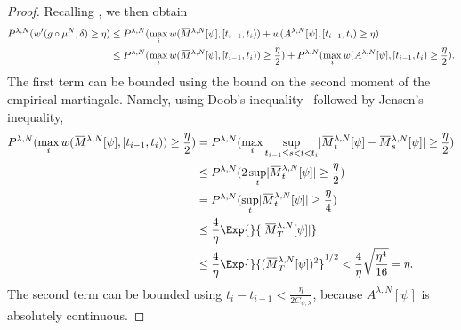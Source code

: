 \begin{proof}
  Recalling , we then obtain
  \begin{equation}
    \begin{split}
      P^{\lambda, N} (w'(g \circ \mu^N, \delta) \geq \eta)
       & \leq P^{\lambda, N}( \max_i w(\ol{M}^{\lambda, N}[\psi], [t_{i-1}, t_i)) + w(A^{\lambda, N}[\psi], [t_{i-1}, t_i) \geq \eta)                                                        \\
       & \leq P^{\lambda, N}( \max_i w(\ol{M}^{\lambda, N}[\psi], [t_{i-1}, t_i)) \geq \frac{\eta}{2}) + P^{\lambda, N}( \max_i w(A^{\lambda, N}[\psi], [t_{i-1}, t_i) \geq \frac{\eta}{2}).
    \end{split}
  \end{equation}
  The first term can be bounded using the bound on the second moment of the empirical martingale.
  Namely, using Doob's inequality~\cite[64]{ethierMarkovProcessesCharacterization1986} followed by Jensen's inequality,
  \begin{equation}
    \begin{split}
      P^{\lambda, N}( \max_i w(\ol{M}^{\lambda, N}[\psi], [t_{i-1}, t_i)) \geq \frac{\eta}{2} )
       & = P^{\lambda, N}( \max_i \sup_{t_{i-1} \leq s < t < t_i} \abs{ \ol{M}_t^{\lambda, N}[\psi] - \ol{M}_s^{\lambda, N}[\psi] } \geq \frac{\eta}{2} ) \\
       & \leq P^{\lambda, N}( 2 \sup_{t} \abs{ \ol{M}_t^{\lambda, N}[\psi] } \geq \frac{\eta}{2} )                                                        \\
       & = P^{\lambda, N}( \sup_{t} \abs{ \ol{M}_t^{\lambda, N}[\psi] } \geq \frac{\eta}{4} )                                                             \\
       & \leq \frac{4}{\eta} \Exp{}{\abs{ \ol{M}_T^{\lambda, N}[\psi] }}                                                                                  \\
       & \leq \frac{4}{\eta} \Exp{}{ ( \ol{M}_T^{\lambda, N}[\psi] )^2 }^{1/2}
      < \frac{4}{\eta} \sqrt{\frac{\eta^4}{16}}
      = \eta.
    \end{split}
  \end{equation}
  The second term can be bounded using \( t_i - t_{i-1} < \frac{\eta}{2C_{\psi, \lambda}} \), because \( A^{\lambda, N}[\psi] \) is absolutely continuous.

\end{proof}
